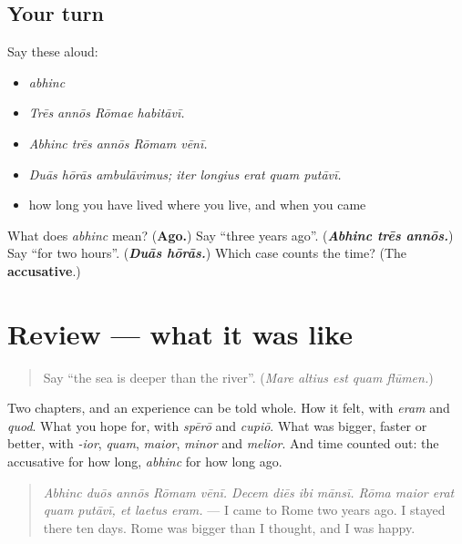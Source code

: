 \subsection*{Your turn}
Say these aloud:

\begin{itemize}
\raggedright
  \item \emph{abhinc}
  \item \emph{Trēs annōs Rōmae habitāvī.}
  \item \emph{Abhinc trēs annōs Rōmam vēnī.}
  \item \emph{Duās hōrās ambulāvimus; iter longius erat quam putāvī.}
  \item how long you have lived where you live, and when you came
\end{itemize}

\begin{tcolorbox}[breakable,colback=teal!4,colframe=teal!35!black,title={Before you move on}]
What does \emph{abhinc} mean? (\textbf{Ago.}) Say \textquotedblleft{}three years ago\textquotedblright{}. (\emph{\textbf{Abhinc trēs annōs.}}) Say \textquotedblleft{}for two hours\textquotedblright{}. (\emph{\textbf{Duās hōrās.}}) Which case counts the time? (The \textbf{accusative}.)
\end{tcolorbox}
\section[(review)]{Review — what it was like}

\label{lesson:LA-R288-bigger-and-how-long}



\begin{quote}
Say \textquotedblleft{}the sea is deeper than the river\textquotedblright{}. (\emph{Mare altius est quam flūmen.})
\end{quote}

\begin{grammarlens}[title={What you've built}]
Two chapters, and an experience can be told whole. How it felt, with \emph{eram} and \emph{quod}. What you hope for, with \emph{spērō} and \emph{cupiō}. What was bigger, faster or better, with \emph{-ior}, \emph{quam}, \emph{maior}, \emph{minor} and \emph{melior}. And time counted out: the accusative for how long, \emph{abhinc} for how long ago.

\begin{quote}
\emph{Abhinc duōs annōs Rōmam vēnī. Decem diēs ibi mānsī. Rōma maior erat quam putāvī, et laetus eram.} — I came to Rome two years ago. I stayed there ten days. Rome was bigger than I thought, and I was happy.
\end{quote}
\end{grammarlens}

